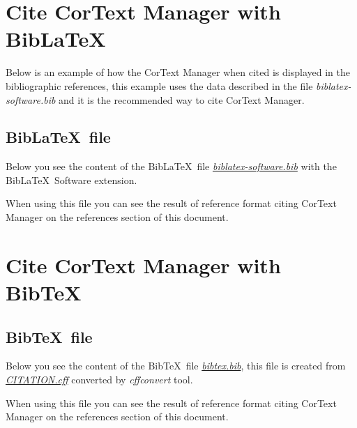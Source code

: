 \documentclass{article}
\begin{document}
\section{Cite CorText Manager with Bib\LaTeX} \label{example-biblatex}

Below is an example of how the CorText Manager when cited
\cite{cortext_manager_v2} is displayed in the bibliographic references, this
example uses the data described in the file {\em biblatex-software.bib} and it
is the recommended way to cite CorText Manager.

\printbibliography[type=software,title={\small References (example)}]

\subsection{Bib\LaTeX \ file}

Below you see the content of the Bib\LaTeX \ file
\href{https://github.com/cortext/how-to-cite-cortext/blob/main/biblatex-software.bib}{\em biblatex-software.bib}
with the Bib\LaTeX \ Software extension\cite{softwareheritageorg_citing_2020}.


When using this file you can see the result of reference format citing CorText
Manager \cite{cortext_manager_v2} on the references section of this document.

\section{Cite CorText Manager with Bib\TeX} \label{example-bibtex}

\printbibliography[type=misc,keyword=cortext,title={\small References (example)}]

\subsection{Bib\TeX \ file}

Below you see the content of the Bib\TeX \ file
\href{https://github.com/cortext/how-to-cite-cortext/blob/main/bibtex.bib}{\em bibtex.bib},
this file is created from
\href{https://github.com/cortext/how-to-cite-cortext/blob/main/CITATION.cff}{\em CITATION.cff}
converted by {\em cffconvert} tool.


When using this file you can see the result of reference format citing CorText
Manager \cite{cortext_manager_v2_bibtex} on the references section of this document.
\end{document}
